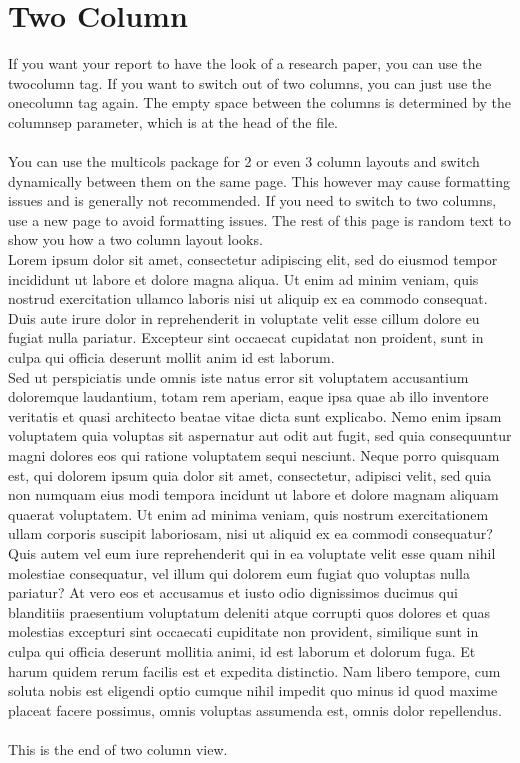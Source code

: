 \documentclass[ 12pt,a4paper,twocolumn,fleqn]{article}
\begin{document}
\section{Two Column}
If you want your report to have the look of a research paper, you can use the twocolumn tag. If you want to switch out of two columns, you can just use the onecolumn tag again. The empty space between the columns is determined by the columnsep parameter, which is at the head of the file. \\
\\
You can use the multicols package for 2 or even 3 column layouts and switch dynamically between them on the same page. This however may cause formatting issues and is generally not recommended. If you need to switch to two columns, use a new page to avoid formatting issues. The rest of this page is random text to show you how a two column layout looks.
\\
Lorem ipsum dolor sit amet, consectetur adipiscing elit, sed do eiusmod tempor incididunt ut labore et dolore magna aliqua. Ut enim ad minim veniam, quis nostrud exercitation ullamco laboris nisi ut aliquip ex ea commodo consequat. Duis aute irure dolor in reprehenderit in voluptate velit esse cillum dolore eu fugiat nulla pariatur. Excepteur sint occaecat cupidatat non proident, sunt in culpa qui officia deserunt mollit anim id est laborum.
\\
Sed ut perspiciatis unde omnis iste natus error sit voluptatem accusantium doloremque laudantium, totam rem aperiam, eaque ipsa quae ab illo inventore veritatis et quasi architecto beatae vitae dicta sunt explicabo. Nemo enim ipsam voluptatem quia voluptas sit aspernatur aut odit aut fugit, sed quia consequuntur magni dolores eos qui ratione voluptatem sequi nesciunt. Neque porro quisquam est, qui dolorem ipsum quia dolor sit amet, consectetur, adipisci velit, sed quia non numquam eius modi tempora incidunt ut labore et dolore magnam aliquam quaerat voluptatem. Ut enim ad minima veniam, quis nostrum exercitationem ullam corporis suscipit laboriosam, nisi ut aliquid ex ea commodi consequatur? Quis autem vel eum iure reprehenderit qui in ea voluptate velit esse quam nihil molestiae consequatur, vel illum qui dolorem eum fugiat quo voluptas nulla pariatur?
At vero eos et accusamus et iusto odio dignissimos ducimus qui blanditiis praesentium voluptatum deleniti atque corrupti quos dolores et quas molestias excepturi sint occaecati cupiditate non provident, similique sunt in culpa qui officia deserunt mollitia animi, id est laborum et dolorum fuga. Et harum quidem rerum facilis est et expedita distinctio. Nam libero tempore, cum soluta nobis est eligendi optio cumque nihil impedit quo minus id quod maxime placeat facere possimus, omnis voluptas assumenda est, omnis dolor repellendus. \\
\\
This is the end of two column view.
\onecolumn
\newpage
  \pagestyle{fancy}
\thisfancypage{%
  \setlength{\fboxsep}{20pt}\doublebox}{}
\end{document}
